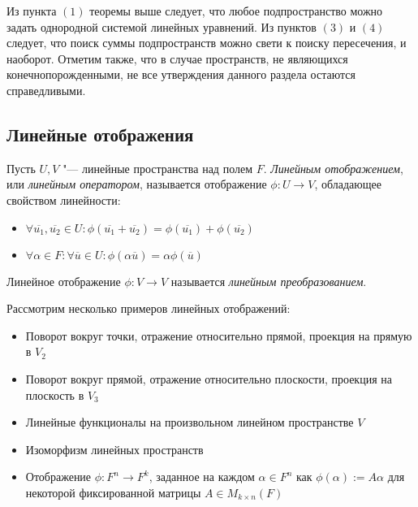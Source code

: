 \begin{note}
	Из пункта $(1)$ теоремы выше следует, что любое подпространство можно задать однородной системой линейных уравнений. Из пунктов $(3)$ и $(4)$ следует, что поиск суммы подпространств можно свети к поиску пересечения, и наоборот. Отметим также, что в случае пространств, не являющихся конечнопорожденными, не все утверждения данного раздела остаются справедливыми.
\end{note}

\subsection{Линейные отображения}

\begin{definition}
	Пусть $U, V$ "--- линейные пространства над полем $F$. \textit{Линейным отображением}, или \textit{линейным оператором}, называется отображение $\phi: U \rightarrow V$, обладающее свойством линейности:
	\begin{itemize}
		\item $\forall \overline{u_1}, \overline{u_2} \in U: \phi(\overline{u_1} + \overline{u_2}) = \phi(\overline{u_1}) + \phi(\overline{u_2})$
		\item $\forall \alpha \in F: \forall \overline{u} \in U: \phi(\alpha\overline{u}) = \alpha\phi(\overline{u})$
	\end{itemize}

	Линейное отображение $\phi: V \rightarrow V$ называется \textit{линейным преобразованием}.
\end{definition}

\begin{example}
	Рассмотрим несколько примеров линейных отображений:
	\begin{itemize}
		\item Поворот вокруг точки, отражение относительно прямой, проекция на прямую в $V_2$
		\item Поворот вокруг прямой, отражение относительно плоскости, проекция на плоскость в $V_3$
		\item Линейные функционалы на произвольном линейном пространстве $V$
		\item Изоморфизм линейных пространств
		\item Отображение $\phi: F^n \rightarrow F^k$, заданное на каждом $\alpha \in F^n$ как $\phi(\alpha) := A\alpha$ для некоторой фиксированной матрицы $A \in M_{k \times n}(F)$
	\end{itemize}
\end{example}

